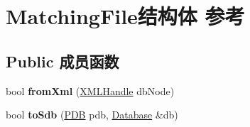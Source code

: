 \hypertarget{struct_matching_file}{}\section{Matching\+File结构体 参考}
\label{struct_matching_file}
\subsection*{Public 成员函数}
\begin{DoxyCompactItemize}
\item 
\mbox{\label{struct_matching_file_ab6d5f6550e0e22980f6a8c7e155246f4}} 
bool {\bfseries from\+Xml} (\hyperlink{classtinyxml2_1_1_x_m_l_handle}{X\+M\+L\+Handle} db\+Node)
\item 
\mbox{\label{struct_matching_file_a245f3d0c3f3dee138526036c0968fd54}} 
bool {\bfseries to\+Sdb} (\hyperlink{struct___d_b}{P\+DB} pdb, \hyperlink{struct_database}{Database} \&db)
\end{DoxyCompactItemize}
